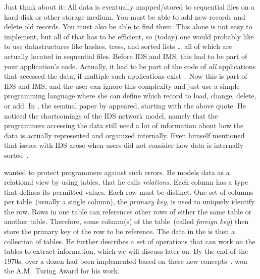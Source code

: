 Just think about it:
All data is eventually mapped/stored to sequential files on a hard disk or other storage medium.
You must be able to add new records and delete old records.
You must also be able to find them.
This alone is not easy to implement, but all of that has to be efficient, so (today) one would probably like to use datastructures like hashes, tress, and sorted lists {\dots} all of which are actually located in sequential files.
Before IDS and IMS, this had to be part of your application's code.
Actually, it had to be part of the code of \emph{all} applications that accessed the data, if multiple such applications exist~\cite{BBP2007TBOI}.
Now this is part of IDS and IMS, and the user can ignore this complexity and just use a simple programming language where she can define which record to load, change, delete, or add.%
%
%
%
In \citeyear{C1970ARMODFLSDB}, the seminal paper \emph{} by \citeauthor{C1970ARMODFLSDB} appeared, starting with the above quote.
He noticed the shortcomings of the IDS network model, namely that the programmers accessing the data still need a lot of information about how the data is actually represented and organized internally.
Even \citeauthor{B2009TOOTIDSITFDAD} himself mentioned that issues with IDS arose when users did not consider how data is internally sorted~\cite{B2009TOOTIDSITFDAD}.

 wanted to protect programmers against such errors.
He models data as a relational view by using tables, that he calls \emph{relations}.
Each column has a type that defines its permitted values.
Each row must be distinct.
One set of columns per table~(usually a single column), the \emph{primary key}, is used to uniquely identify the row.
Rows in one table can references other rows of either the same table or another table.
Therefore, some column(s) of the table~(called \emph{foreign key}) then store the primary key of the row to be reference.
The data in the  is then a collection of tables.
He further describes a set of operations that can work on the tables to extract information, which we will discuss later on.
By the end of the 1970s, over a dozen  had been implemented based on these new concepts~\cite{K1979RDS}.
 won the A.M.~Turing Award for his work.

